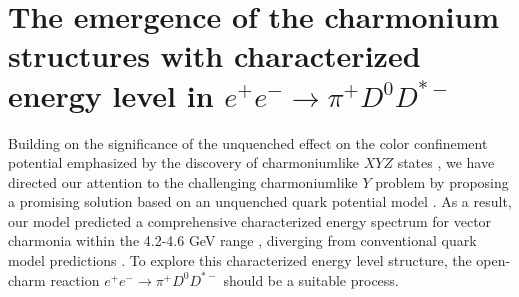 \documentclass[final,5p,times,twocolumn]{elsarticle}
\begin{document}
\section{The emergence of the charmonium structures with characterized energy level in $e^+e^-\to \pi^+ D^0 D^{*-}$}

Building on the significance of the unquenched effect on the color confinement potential emphasized by the discovery of charmoniumlike $XYZ$ states \cite{Chen:2016qju}, we have directed our attention to the challenging charmoniumlike $Y$ problem by proposing a promising solution based on an unquenched quark potential model \cite{Wang:2019mhs}. As a result, our model predicted a comprehensive characterized energy spectrum for vector charmonia within the 4.2-4.6 GeV range \cite{Wang:2019mhs}, diverging from conventional quark model predictions \cite{Eichten:1974af,Eichten:1978tg}. To explore this characterized energy level structure, the open-charm reaction $e^+e^-\to \pi^+ D^0 D^{*-}$ should be a suitable process.  

\end{document}
